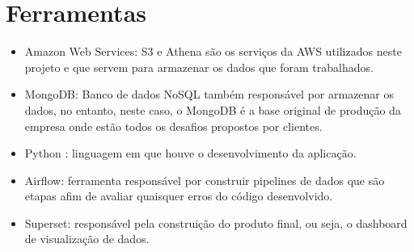 \section{Ferramentas}
    \begin{itemize}
        \item 
        Amazon Web Services: S3 e Athena são os serviços da AWS utilizados neste projeto e que servem para armazenar os dados que foram trabalhados.
       
        \item MongoDB: Banco de dados NoSQL também responsável por armazenar os dados, no entanto, neste caso, o MongoDB é a base original de produção da empresa onde estão todos os desafios propostos por clientes.
        
        \item Python : linguagem em que houve o desenvolvimento da aplicação.
        
        \item Airflow: ferramenta responsável por construir pipelines de dados que são etapas afim de avaliar quaisquer erros do código desenvolvido.
    
        \item Superset: responsável pela construição do produto final, ou seja, o dashboard de visualização de dados.
    
    \end{itemize} 

